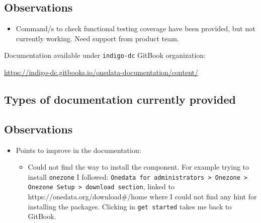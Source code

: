 \documentclass[a4wide,11pt]{article}
\begin{document}
\subsection{Observations}
\begin{itemize}
        \item Command/s to check functional testing coverage have been provided, but not currently working. Need support from product team.
    \end{itemize}



\label{sec:gitbook}
Documentation available under \texttt{indigo-dc} GitBook organization: \vspace{0.1em} \begin{center}\url{https://indigo-dc.gitbooks.io/onedata-documentation/content/}\end{center} 
\subsection{Types of documentation currently provided}
\begin{center}
\end{center}
\subsection{Observations}
\begin{itemize}
        \item Points to improve in the documentation: \begin{itemize} \item Could not find the way to install the component. For example trying to install \texttt{onezone} I followed: \texttt{Onedata for administrators > Onezone > Onezone Setup > download section}, linked to https://onedata.org/download\#/home where I could not find any hint for installing the packages. Clicking in \texttt{get started} takes me back to GitBook. \end{itemize}
    \end{itemize}



\label{sec:configuration}
\end{document}
